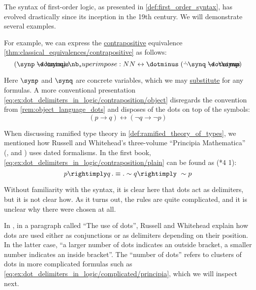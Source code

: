\begin{example}\label{ex:dot_delimiters_in_logic}
  The syntax of first-order logic, as presented in \cref{def:first_order_syntax}, has evolved drastically since its inception in the 19th century. We will demonstrate several examples.

  \begin{thmenum}
     For example, we can express the \hyperref[def:conditional_formula/contrapositive]{contrapositive} equivalence \cref{thm:classical_equivalences/contrapositive} as follows:
    \begin{equation}\label{eq:ex:dot_delimiters_in_logic/contraposition/object}
      (\synp \synimplies \synq) \syniff (\synneg \synq \synimplies \synneg \synp)
    \end{equation}

    Here \( \synp \) and \( \synq \) are concrete variables, which we may \hyperref[def:propositional_substitution]{substitute} for any formulas. A more conventional presentation \eqref{eq:ex:dot_delimiters_in_logic/contraposition/object} disregards the convention from \cref{rem:object_language_dots} and disposes of the dots on top of the symbols:
    \begin{equation}\label{eq:ex:dot_delimiters_in_logic/contraposition/plain}
      (p \rightarrow q) \leftrightarrow (\neg q \rightarrow \neg p)
    \end{equation}

    When discussing ramified type theory in \cref{def:ramified_theory_of_types}, we mentioned how Russell and Whitehead's three-volume \enquote{Principia Mathematica} (\cite{WhiteheadRussell1927PrincipiaMathematicaVol1}, \cite{WhiteheadRussell1927PrincipiaMathematicaVol2} and \cite{WhiteheadRussell1927PrincipiaMathematicaVol3}) uses dated formalisms. In the first book, \eqref{eq:ex:dot_delimiters_in_logic/contraposition/plain} can be found as (*4 1):
    \begin{equation}\label{eq:ex:dot_delimiters_in_logic/contraposition/principia}
      p \rightimply q \qdot \equiv \qdot \sim q \rightimply \ \sim p
    \end{equation}

    Without familiarity with the syntax, it is clear here that dots act as delimiters, but it is not clear how. As it turns out, the rules are quite complicated, and it is unclear why there were chosen at all.

    In \cite[9]{WhiteheadRussell1927PrincipiaMathematicaVol1}, in a paragraph called \enquote{The use of dots}, Russell and Whitehead explain how dots are used either as conjunctions or as delimiters depending on their position. In the latter case, \enquote{a larger number of dots indicates an outside bracket, a smaller number indicates an inside bracket}. The \enquote{number of dots} refers to clusters of dots in more complicated formulas such as \eqref{eq:ex:dot_delimiters_in_logic/complicated/principia}, which we will inspect next.


\end{thmenum}
\end{example}
